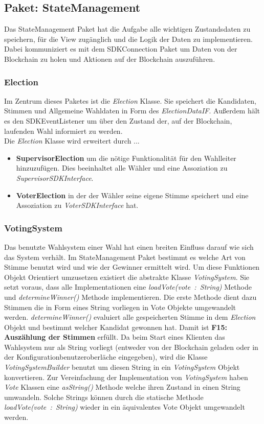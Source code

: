 \documentclass[parskip=full]{scrartcl}
\newcommand{\textitx}[1]{\mbox{\textit{#1}}}
\newcommand{\fakeparagraph}[1]{\textbf{#1}}
\begin{document}
	\subsection{Paket: StateManagement}
	Das StateManagement Paket hat die Aufgabe alle wichtigen Zustandsdaten zu speichern, für die View zugänglich und die Logik der Daten zu implementieren.
	Dabei kommuniziert es mit dem SDKConnection Paket um Daten von der Blockchain zu holen und Aktionen auf der Blockchain auszuführen.
	
		\subsubsection{Election}
		Im Zentrum dieses Paketes ist die \textitx{Election} Klasse. Sie speichert die Kandidaten, Stimmen und Allgemeine Wahldaten in Form des \textitx{ElectionDataIF}. Außerdem hält es den SDKEventListener um über den Zustand der, auf 
		der Blockchain, laufenden Wahl informiert zu werden.\\
		Die \textitx{Election} Klasse wird erweitert durch ...
		\begin{itemize}
			\item\fakeparagraph{SupervisorElection} um die nötige Funktionalität für den Wahlleiter hinzuzufügen. Dies beeinhaltet alle Wähler und eine Assoziation zu \textitx{SupervisorSDKInterface}.
			\item\fakeparagraph{VoterElection} in der der Wähler seine eigene Stimme speichert und eine Assoziation zu \textitx{VoterSDKInterface} hat.
		\end{itemize}
		
		\subsubsection{VotingSystem}
		Das benutzte Wahlsystem einer Wahl hat einen breiten Einfluss darauf wie sich das System verhält. Im StateManagement Paket bestimmt es welche Art von Stimme benutzt wird und wie der Gewinner ermittelt wird.
		Um diese Funktionen Objekt Orientiert umzusetzen existiert die abstrakte Klasse \textitx{VotingSystem}. Sie setzt voraus, dass alle Implementationen eine \textitx{loadVote(vote : String)} Methode und \textitx{determineWinner()} Methode implementieren. Die erste Methode dient dazu Stimmen die in Form eines String vorliegen in Vote Objekte umgewandelt werden. \textitx{determineWinner()} evaluiert alle gespeicherten Stimme in dem \textitx{Election} Objekt und bestimmt welcher Kandidat gewonnen hat. Damit ist \textbf{F15: Auszählung der Stimmen} erfüllt.
		Da beim Start eines Klienten das Wahlsystem nur als String vorliegt (entweder von der Blockchain geladen oder in der Konfigurationbenutzeroberläche eingegeben), wird die Klasse \textit{VotingSystemBuilder} benutzt um diesen String in ein \textitx{VotingSystem} Objekt konvertieren.
		Zur Vereinfachung der Implementation von \textitx{VotingSystem} haben \textitx{Vote} Klassen eine \textitx{asString()} Methode welche ihren Zustand in einen String umwandeln. Solche Strings können durch die statische Methode \textitx{loadVote(vote : String)} wieder in ein äquivalentes Vote Objekt umgewandelt werden.
\end{document}
